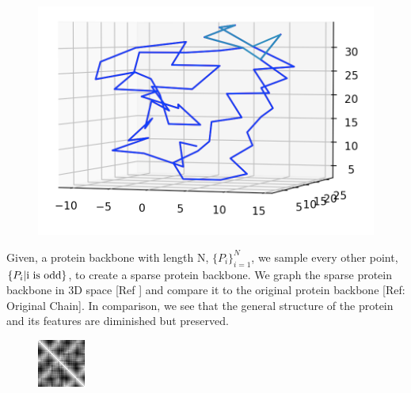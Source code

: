 \documentclass[12pt, a4paper, twocolumn, fullpage]{article}
\theoremstyle{plain}
\theoremstyle{definition}
\theoremstyle{remark}
\begin{document}
\begin{figure}[h]
	\centering
	\includegraphics[width=\linewidth]{1ux8sparse}
	\caption{}
	\label{fig:network}
\end{figure}

Given, a protein backbone with length N, $\{P_i\}^{N}_{i=1}$, we sample every other point, $\{P_i \space | \space \text{i is odd} \}$, to create a sparse protein backbone. We graph the sparse protein backbone in 3D space [Ref ] and compare it to the original protein backbone [Ref: Original Chain]. In comparison, we see that the general structure of the protein and its features are diminished but preserved.

\begin{figure}[h]
	\centering
	\includegraphics[width=.7\linewidth]{1ux8pdbSparseDistM}
	\caption{}
	\label{fig:network}
\end{figure}
\end{document}
